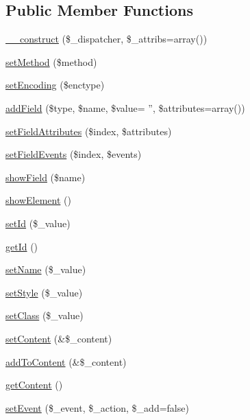 \subsection*{Public Member Functions}
\begin{DoxyCompactItemize}
\item 
\hyperlink{classForm_ae90293f5520279d6c18f416d3f883ac8}{\_\-\_\-construct} (\$\_\-dispatcher, \$\_\-attribs=array())
\item 
\hyperlink{classForm_a2dc6461afb09effeefe444847ad9b562}{setMethod} (\$method)
\item 
\hyperlink{classForm_a2b1f9bb23c4da0558002b62f60b55078}{setEncoding} (\$enctype)
\item 
\hyperlink{classForm_a880197a858a70581146d6f0d275eff02}{addField} (\$type, \$name, \$value= '', \$attributes=array())
\item 
\hyperlink{classForm_a83cd5bed7649ecfe202dd97a8129f6f8}{setFieldAttributes} (\$index, \$attributes)
\item 
\hyperlink{classForm_a011360ce04a237f5609446f3134ec32c}{setFieldEvents} (\$index, \$events)
\item 
\hyperlink{classForm_a29e01263557e33fab02ee5c3aaa0b3f5}{showField} (\$name)
\item 
\hyperlink{classForm_aeac5855c8b2406c34090a621d59df664}{showElement} ()
\item 
\hyperlink{classBaseElement_a0c1ce3d1684ecb78960cf7a97278494e}{setId} (\$\_\-value)
\item 
\hyperlink{classBaseElement_a4a7aa583ee21af392908d7fd42fde790}{getId} ()
\item 
\hyperlink{classBaseElement_a39bafb3609d10048920c20242c2a04c5}{setName} (\$\_\-value)
\item 
\hyperlink{classBaseElement_a6b2b9ff69f6e92db82f91d9c55cda697}{setStyle} (\$\_\-value)
\item 
\hyperlink{classBaseElement_af6597b30fa9798878f6290271043dfa2}{setClass} (\$\_\-value)
\item 
\hyperlink{classBaseElement_a164a9c6e4ee68afa0ad343942ba54d28}{setContent} (\&\$\_\-content)
\item 
\hyperlink{classBaseElement_abd48eef64ca4f419f26d66a0c0419908}{addToContent} (\&\$\_\-content)
\item 
\hyperlink{classBaseElement_af8c86b93bcdcfbc415bf96c622dc5516}{getContent} ()
\item 
\hyperlink{classBaseElement_ad5789f45f16aaa144716ee8558069c31}{setEvent} (\$\_\-event, \$\_\-action, \$\_\-add=false)
\item 

\end{DoxyCompactItemize}
